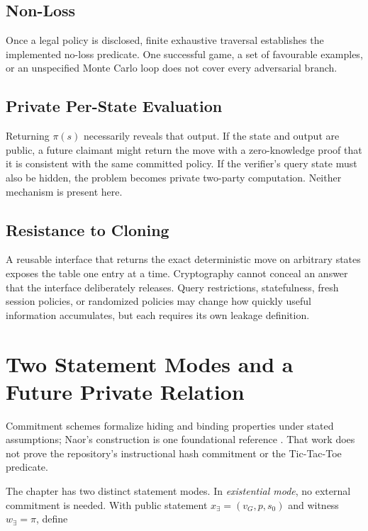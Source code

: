 \subsection{Non-Loss}

Once a legal policy is disclosed, finite exhaustive traversal establishes the
implemented no-loss predicate. One successful game, a set of favourable
examples, or an unspecified Monte Carlo loop does not cover every adversarial
branch.

\subsection{Private Per-State Evaluation}

Returning $\pi(s)$ necessarily reveals that output. If the state and output
are public, a future claimant might return the move with a zero-knowledge proof
that it is consistent with the same committed policy. If the verifier's query
state must also be hidden, the problem becomes private two-party computation.
Neither mechanism is present here.

\subsection{Resistance to Cloning}

A reusable interface that returns the exact deterministic move on arbitrary
states exposes the table one entry at a time. Cryptography cannot conceal an
answer that the interface deliberately releases. Query restrictions,
statefulness, fresh session policies, or randomized policies may change how
quickly useful information accumulates, but each requires its own leakage
definition.

\section{Two Statement Modes and a Future Private Relation}
\label{sec:ttt-future-relation}

Commitment schemes formalize hiding and binding properties under stated
assumptions; Naor's construction is one foundational reference
\cite{naor1991bitcommitment}. That work does not prove the repository's
instructional hash commitment or the Tic-Tac-Toe predicate.

The chapter has two distinct statement modes. In \emph{existential mode}, no
external commitment is needed. With public statement
$x_{\exists}=(v_G,p,s_0)$ and witness $w_{\exists}=\pi$, define

